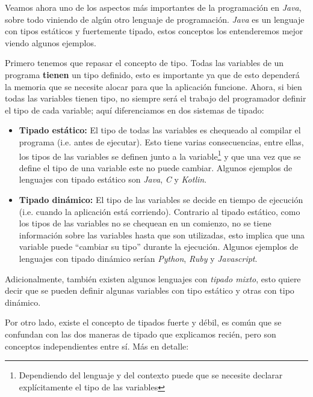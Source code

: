 Veamos ahora uno de los aspectos más importantes de la programación en \textit{Java}, sobre todo
viniendo de algún otro lenguaje de programación.
\textit{Java} es un lenguaje con tipos estáticos y fuertemente tipado, estos conceptos los 
entenderemos mejor viendo algunos ejemplos.

Primero tenemos que repasar el concepto de tipo.
Todas las variables de un programa \textbf{tienen} un tipo definido, esto es importante ya que
de esto dependerá la memoria que se necesite alocar para que la aplicación funcione.
Ahora, si bien todas las variables tienen tipo, no siempre será el trabajo del programador
definir el tipo de cada variable; aquí diferenciamos en dos sistemas de tipado:

\begin{itemize}
  \item \textbf{Tipado estático:} El tipo de todas las variables es chequeado al compilar el 
    programa (i.e. antes de ejecutar).
    Esto tiene varias consecuencias, entre ellas, los tipos de las variables se definen junto
    a la variable\footnote{Dependiendo del lenguaje y del contexto puede que se necesite 
    declarar explícitamente el tipo de las variables} y que una vez que se define el tipo de
    una variable este no puede cambiar.
    Algunos ejemplos de lenguajes con tipado estático son \textit{Java}, \textit{C} y 
    \textit{Kotlin}.
  \item \textbf{Tipado dinámico:} El tipo de las variables se decide en tiempo de ejecución 
    (i.e. cuando la aplicación está corriendo).
    Contrario al tipado estático, como los tipos de las variables no se chequean en un 
    comienzo, no se tiene información sobre las variables hasta que son utilizadas, esto 
    implica que una variable puede \enquote{cambiar su tipo} durante la ejecución.
    Algunos ejemplos de lenguajes con tipado dinámico serían \textit{Python}, \textit{Ruby} y
    \textit{Javascript}.
\end{itemize}

Adicionalmente, también existen algunos lenguajes con \textit{tipado mixto}, esto quiere decir
que se pueden definir algunas variables con tipo estático y otras con tipo dinámico.

Por otro lado, existe el concepto de tipados fuerte y débil, es común que se confundan con las
dos maneras de tipado que explicamos recién, pero son conceptos independientes entre sí.
Más en detalle:

